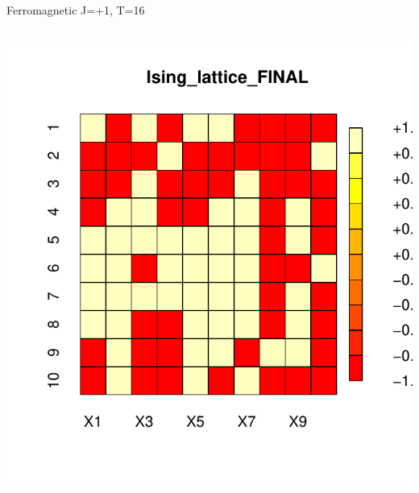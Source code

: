 \documentclass{beamer}
\begin{document}
\begin{frame}{Ferromagnetic J=+1, T=16}
\begin{columns}
\begin{column}{0.5\textwidth}
\begin{center}
     \includegraphics[width=\textwidth]{Pic/J+1_10_2500_T=16_FINAL.pdf}
     \end{center}
\end{column}
\end{columns}
\end{frame}
\end{document}
